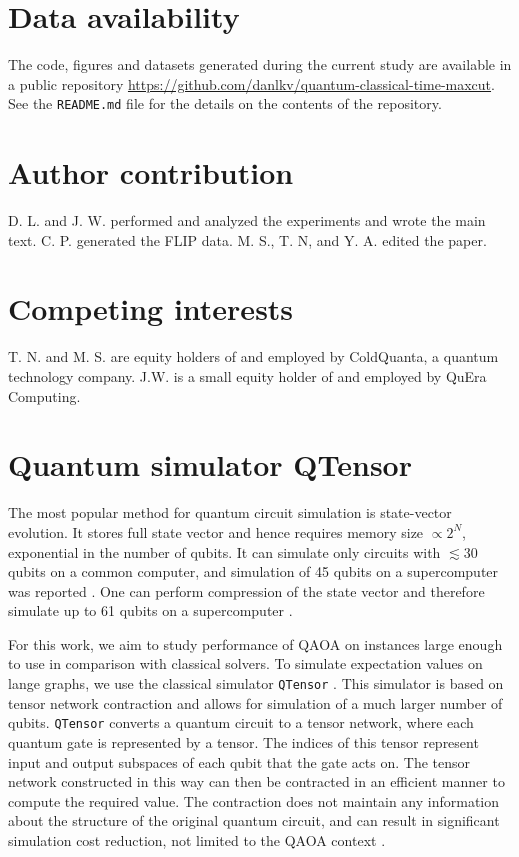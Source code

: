 \documentclass[prb,reprint,nofootinbib,longbibliography,superscriptaddress]{revtex4-1}
\begin{document}
\section{Data availability}
The code, figures and datasets generated during the current study are available in a public repository
\url{https://github.com/danlkv/quantum-classical-time-maxcut}.
See the \texttt{README.md} file for the details on the contents of the repository.


\section{Author contribution}

D. L. and J. W. performed and analyzed the experiments and wrote the main text.
C. P. generated the FLIP data. M. S., T. N, and Y. A.
edited the paper.

\section{Competing interests}

T. N. and M. S. are equity holders of and employed by ColdQuanta, a quantum technology company.
J.W. is a small equity holder of and employed by QuEra Computing.



\appendix


\section{Quantum simulator QTensor}
\label{sec:qtensor}


The most popular method for quantum circuit simulation is state-vector evolution. It stores full state vector and hence requires memory size $\propto 2^N$, exponential in the number of qubits. It can simulate only circuits with $\lesssim 30$ qubits on a common computer, and simulation of 45 qubits on a supercomputer was reported \cite{statevector_sim}.
One can perform compression of the state vector and therefore simulate up to 61 qubits on a supercomputer \cite{Wu2019}.


For this work, we aim to study performance of QAOA on instances large enough to use in comparison with classical solvers. To simulate expectation values on lange graphs, we use the classical simulator \texttt{QTensor} \cite{qtensor, lykov2021large}. This simulator is based on tensor network contraction and allows for simulation of a much larger number of qubits. 
\texttt{QTensor} converts a quantum circuit to a tensor network, where each quantum gate is represented by a tensor. The indices of this tensor represent input and output subspaces of each qubit that the gate acts on. The tensor network constructed in this way can then be contracted in an efficient manner to compute the required value.
The contraction does not maintain any information about the structure of the original quantum circuit, and can result in significant simulation cost reduction, not limited to the QAOA context \cite{HenryML}. 
\end{document}
